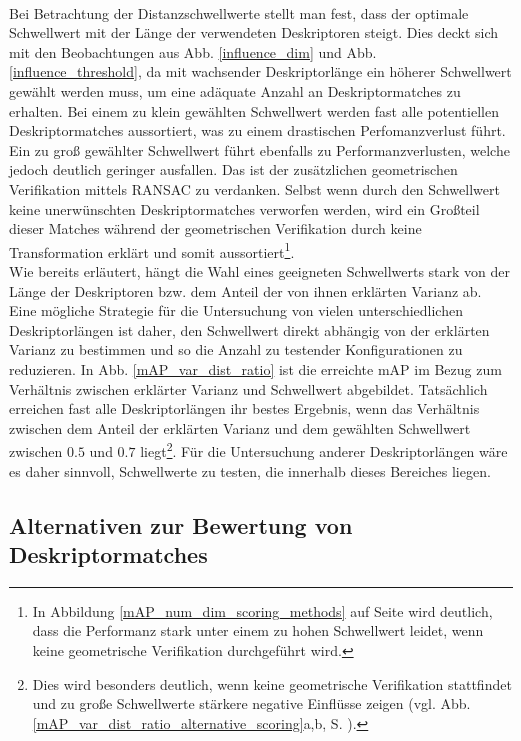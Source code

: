 \\
Bei Betrachtung der Distanzschwellwerte stellt man fest, dass der optimale Schwellwert mit der Länge der verwendeten Deskriptoren steigt. Dies deckt sich mit den Beobachtungen aus Abb. \ref{influence_dim} und Abb. \ref{influence_threshold}, da mit wachsender Deskriptorlänge ein höherer Schwellwert gewählt werden muss, um eine adäquate Anzahl an Deskriptormatches zu erhalten. Bei einem zu klein gewählten Schwellwert werden fast alle potentiellen Deskriptormatches aussortiert, was zu einem drastischen Perfomanzverlust führt. Ein zu groß gewählter Schwellwert führt ebenfalls zu Performanzverlusten, welche jedoch deutlich geringer ausfallen. Das ist der zusätzlichen geometrischen Verifikation mittels RANSAC zu verdanken. Selbst wenn durch den Schwellwert keine unerwünschten Deskriptormatches verworfen werden, wird ein Großteil dieser Matches während der geometrischen Verifikation durch keine Transformation erklärt und somit aussortiert\footnote{In Abbildung \ref{mAP_num_dim_scoring_methods} auf Seite \pageref{mAP_num_dim_scoring_methods} wird deutlich, dass die Performanz stark unter einem zu hohen Schwellwert leidet, wenn keine geometrische Verifikation durchgeführt wird.}. \\
Wie bereits erläutert, hängt die Wahl eines geeigneten Schwellwerts stark von der Länge der Deskriptoren bzw. dem Anteil der von ihnen erklärten Varianz ab. Eine mögliche Strategie für die Untersuchung von vielen unterschiedlichen Deskriptorlängen ist daher, den Schwellwert direkt abhängig von der erklärten Varianz zu bestimmen und so die Anzahl zu testender Konfigurationen zu reduzieren. In Abb. \ref{mAP_var_dist_ratio} ist die erreichte mAP im Bezug zum Verhältnis zwischen erklärter Varianz und Schwellwert abgebildet. Tatsächlich erreichen fast alle Deskriptorlängen ihr bestes Ergebnis, wenn das Verhältnis zwischen dem Anteil der erklärten Varianz und dem gewählten Schwellwert zwischen $0.5$ und $0.7$ liegt\footnote{Dies wird besonders deutlich, wenn keine geometrische Verifikation stattfindet und zu große Schwellwerte stärkere negative Einflüsse zeigen (vgl. Abb. \ref{mAP_var_dist_ratio_alternative_scoring}a,b, S. \pageref{mAP_var_dist_ratio_alternative_scoring}).}. Für die Untersuchung anderer Deskriptorlängen wäre es daher sinnvoll, Schwellwerte zu testen, die innerhalb dieses Bereiches liegen.

\subsection{Alternativen zur Bewertung von Deskriptormatches}\label{metric_experiment}

